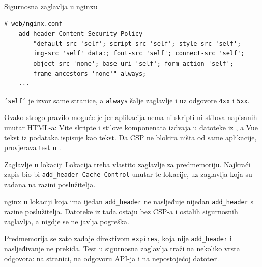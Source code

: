 \begin{frame}[fragile]{Sigurnosna zaglavlja u nginxu}
\begin{lstlisting}
# web/nginx.conf
    add_header Content-Security-Policy
        "default-src 'self'; script-src 'self'; style-src 'self';
        img-src 'self' data:; font-src 'self'; connect-src 'self';
        object-src 'none'; base-uri 'self'; form-action 'self';
        frame-ancestors 'none'" always;
    ...
\end{lstlisting}

\vspace{0.3em}
\texttt{'self'} je izvor same stranice, a \texttt{always} šalje zaglavlje i uz odgovore \texttt{4xx} i \texttt{5xx}.

\vspace{0.3em}
Ovako strogo pravilo moguće je jer aplikacija nema ni skripti ni stilova napisanih unutar HTML-a: Vite skripte i stilove komponenata izdvaja u datoteke iz , a Vue tekst iz podataka ispisuje kao tekst. Da CSP ne blokira ništa od same aplikacije, provjerava test u .
\end{frame}

\begin{frame}{Zaglavlje u lokaciji}
Lokacija  treba vlastito zaglavlje za predmemoriju. Najkraći zapis bio bi \texttt{add\_header Cache-Control} unutar te lokacije, uz zaglavlja koja su zadana na razini poslužitelja.

\pause
\vspace{0.9em}
nginx u lokaciji koja ima ijedan \texttt{add\_header} ne nasljeđuje nijedan \texttt{add\_header} s razine poslužitelja. Datoteke iz  tada ostaju bez CSP-a i ostalih sigurnosnih zaglavlja, a nigdje se ne javlja pogreška.

\vspace{0.9em}
Predmemorija se zato zadaje direktivom \texttt{expires}, koja nije \texttt{add\_header} i nasljeđivanje ne prekida. Test u  sigurnosna zaglavlja traži na nekoliko vrsta odgovora: na stranici, na odgovoru API-ja i na nepostojećoj datoteci.
\end{frame}


